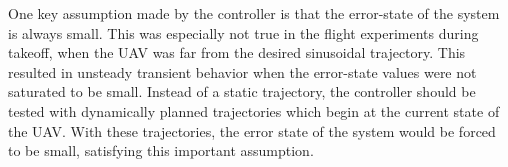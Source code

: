 One key assumption made by the controller is that the
error-state of the system is always small. This was
especially not true in the flight experiments during takeoff, when the UAV was far from the
desired sinusoidal trajectory.
This resulted in unsteady transient behavior when the error-state values were
not saturated to be small.
Instead of a static trajectory,
the controller should be tested with
dynamically planned trajectories which begin at the current state of the
UAV. With these trajectories, the error state of the system would be forced to
be small, satisfying this important assumption.
